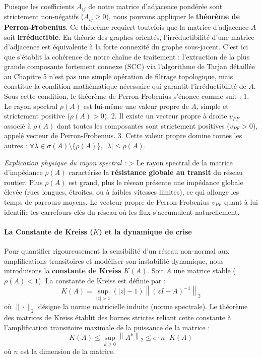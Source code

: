 \documentclass[10pt, a4paper]{article}
\begin{document}
Puisque les coefficients \(A_{ij}\) de notre matrice d'adjacence
pondérée sont strictement non-négatifs (\(A_{ij} \ge 0\)), nous pouvons
appliquer le \textbf{théorème de Perron-Frobenius}. Ce théorème requiert
toutefois que la matrice d'adjacence \(A\) soit \textbf{irréductible}.
En théorie des graphes orientés, l'irréductibilité d'une matrice
d'adjacence est équivalente à la forte connexité du graphe sous-jacent.
C'est ici que s'établit la cohérence de notre chaîne de traitement :
l'extraction de la plus grande composante fortement connexe (SCC) via
l'algorithme de Tarjan détaillée au Chapitre 5 n'est pas une simple
opération de filtrage topologique, mais constitue la condition
mathématique nécessaire qui garantit l'irréductibilité de \(A\). Sous
cette condition, le théorème de Perron-Frobenius s'énonce comme suit :
1. Le rayon spectral \(\rho(A)\) est lui-même une valeur propre de
\(A\), simple et strictement positive (\(\rho(A) > 0\)). 2. Il existe un
vecteur propre à droite \(v_{PF}\) associé à \(\rho(A)\) dont toutes les
composantes sont strictement positives (\(v_{PF} > 0\)), appelé vecteur
de Perron-Frobenius. 3. Cette valeur propre domine toutes les autres :
\(\forall \lambda \in \sigma(A) \setminus \{\rho(A)\}, \ |\lambda| \le \rho(A)\).

\emph{Explication physique du rayon spectral :} \textgreater{} Le rayon
spectral de la matrice d'impédance \(\rho(A)\) caractérise la
\textbf{résistance globale au transit} du réseau routier. Plus
\(\rho(A)\) est grand, plus le réseau présente une impédance globale
élevée (rues longues, étroites, ou à faibles vitesses limites), ce qui
allonge les temps de parcours moyens. Le vecteur propre de
Perron-Frobenius \(v_{PF}\) quant à lui identifie les carrefours clés du
réseau où les flux s'accumulent naturellement.

\paragraph{\texorpdfstring{La Constante de Kreiss (\(K\)) et la
dynamique de
crise}{La Constante de Kreiss (K) et la dynamique de crise}}\label{la-constante-de-kreiss-k-et-la-dynamique-de-crise}

Pour quantifier rigoureusement la sensibilité d'un réseau non-normal aux
amplifications transitoires et modéliser son instabilité dynamique, nous
introduisons la \textbf{constante de Kreiss} \(K(A)\). Soit \(A\) une
matrice stable (\(\rho(A) < 1\)). La constante de Kreiss est définie par
: \[K(A) = \sup_{|z| > 1} (|z| - 1) \left\| (zI - A)^{-1} \right\|_2\]
où \(\|\cdot\|_2\) désigne la norme matricielle induite (norme
spectrale). Le théorème des matrices de Kreiss établit des bornes
strictes reliant cette constante à l'amplification transitoire maximale
de la puissance de la matrice :
\[K(A) \le \sup_{k \ge 0} \left\| A^k \right\|_2 \le e \cdot n \cdot K(A)\]
où \(n\) est la dimension de la matrice.
\end{document}
